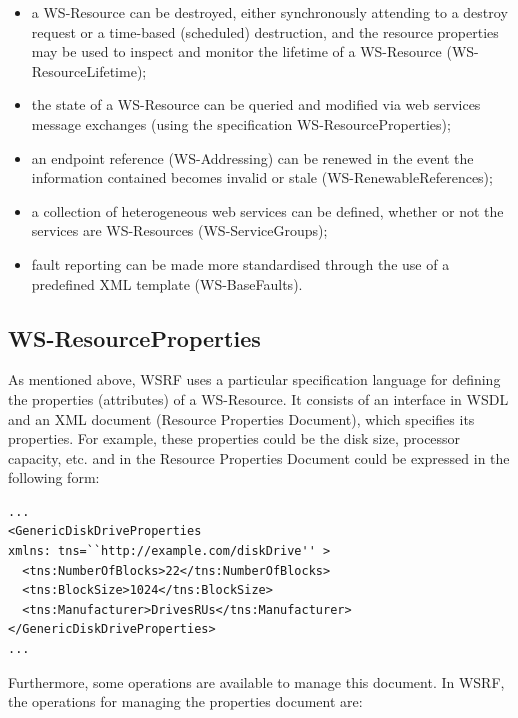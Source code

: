 \begin{itemize}
\item a WS-Resource can be destroyed, either synchronously attending to a
destroy request or a time-based (scheduled)
destruction, and the resource properties may be used to inspect and monitor the lifetime of a WS-Resource (WS-ResourceLifetime);
\item the state of  a WS-Resource 
can be queried and modified via web services
message exchanges (using the specification WS-ResourceProperties);
\item an endpoint reference (WS-Addressing) can be renewed in the
event the information contained becomes invalid
or stale (WS-RenewableReferences);
\item a collection of heterogeneous web services can be defined,
whether or not the services are WS-Resources (WS-ServiceGroups);  
\item fault reporting can be made more standardised through the use of a predefined XML
template (WS-BaseFaults). 
\end{itemize} 

\subsection{WS-ResourceProperties}

As mentioned above, WSRF uses a particular specification language 
for defining the properties (attributes) of a WS-Resource. It consists of 
an interface in WSDL and an XML document (Resource Properties Document), which
specifies its properties. For example, these properties could be the disk size, processor capacity, etc. and
in the Resource Properties Document could be expressed in the following form:

\begin{lstlisting}
...
<GenericDiskDriveProperties 
xmlns: tns=``http://example.com/diskDrive'' >
  <tns:NumberOfBlocks>22</tns:NumberOfBlocks>
  <tns:BlockSize>1024</tns:BlockSize>
  <tns:Manufacturer>DrivesRUs</tns:Manufacturer>
</GenericDiskDriveProperties>
...
\end{lstlisting}

Furthermore, some operations are available to manage this document. In WSRF, the operations for managing the properties document are:

